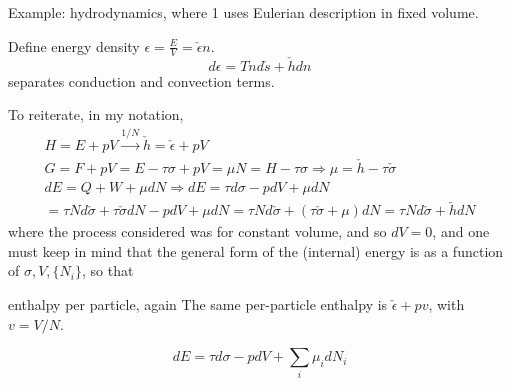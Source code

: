 \begin{enumerate}
Example: hydrodynamics, where 1 uses Eulerian description in fixed volume. 

Define energy density $\epsilon = \frac{E}{V} = \check{\epsilon}n$. 
\[
d\epsilon = Tn d\check{s} + \check{h} dn
\]
separates conduction and convection terms.  

To reiterate, in my notation,
\[
\begin{gathered}
  H = E + pV \xrightarrow{ 1/N} \check{h} = \check{\epsilon} + pV \\ 
  G = F+ pV = E-\tau \sigma + pV = \mu N = H-\tau \sigma \Longrightarrow \mu = \check{h} - \tau \check{\sigma}\\
  dE = Q + W + \mu dN \Longrightarrow dE = \tau d\sigma - pdV + \mu dN \\
  = \tau N d\check{\sigma} + \tau \check{\sigma}dN - pdV + \mu dN = \tau N d\check{\sigma} + (\tau \check{\sigma} + \mu ) dN = \tau N d\check{\sigma} + \check{h} dN
\end{gathered}
\]
where the process considered was for constant volume, and so $dV=0$, and one must keep in mind that the general form of the (internal) energy is as a function of $\sigma, V, \lbrace N_i \rbrace$, so that
\begin{correction}{enthalpy per particle, again}
The same per-particle enthalpy is $\check\epsilon + pv$, with $v = V/N$.
\end{correction} 
\[
dE = \tau d\sigma - pdV + \sum_i \mu_i dN_i
\]

\end{enumerate}










